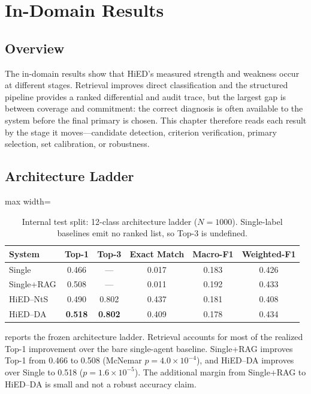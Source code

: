 \chapter{In-Domain Results}
\label{ch:results}

\section{Overview}

The in-domain results show that HiED's measured strength and weakness occur at different stages. Retrieval improves direct classification and the structured pipeline provides a ranked differential and audit trace, but the largest gap is between coverage and commitment: the correct diagnosis is often available to the system before the final primary is chosen. This chapter therefore reads each result by the stage it moves---candidate detection, criterion verification, primary selection, set calibration, or robustness.

\section{Architecture Ladder}

\begin{table}[htbp]
\centering
\caption{Internal test split: 12-class architecture ladder ($N=1000$). Single-label baselines emit no ranked list, so Top-3 is undefined.}
\label{tab:ladder-rewrite}
\begin{adjustbox}{max width=\textwidth}
\begin{tabular}{lccccc}
\toprule
System & Top-1 & Top-3 & Exact Match & Macro-F1 & Weighted-F1\\
\midrule
Single & 0.466 & --- & 0.017 & 0.183 & 0.426\\
Single+RAG & 0.508 & --- & 0.011 & 0.192 & 0.433\\
HiED--NtS & 0.490 & 0.802 & 0.437 & 0.181 & 0.408\\
HiED--DA & \textbf{0.518} & \textbf{0.802} & 0.409 & 0.178 & 0.434\\
\bottomrule
\end{tabular}
\end{adjustbox}
\end{table}

 reports the frozen architecture ladder. Retrieval accounts for most of the realized Top-1 improvement over the bare single-agent baseline. Single+RAG improves Top-1 from 0.466 to 0.508 (McNemar $p=4.0\times10^{-4}$), and HiED--DA improves over Single to 0.518 ($p=1.6\times10^{-5}$). The additional margin from Single+RAG to HiED--DA is small and not a robust accuracy claim.

